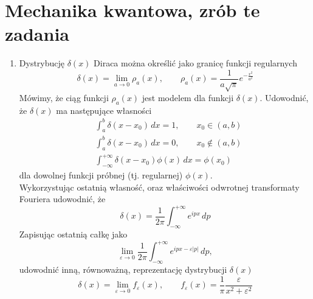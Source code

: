 \documentclass[a4paper,11pt]{article}
\begin{document}
\section{Mechanika kwantowa, zrób te zadania}





\begin{enumerate}
\item Dystrybucję $\delta( x )$ Diraca można określić jako granicę funkcji
  regularnych
  \begin{equation}
    \label{eq:1}
    \delta( x ) = \lim_{ a \to 0 } \rho_{ a }( x ), \qquad
    \rho_{ a }( x ) = \frac{ 1 }{ a \sqrt{ \pi } } e^{ -\frac{ x^{ 2 } }{ a^{ 2 } } }
  \end{equation}
  Mówimy, że ciąg funkcji $\rho_{ a }( x )$ jest modelem dla funkcji
  $\delta( x )$. Udowodnić, że $\delta( x )$ ma następujące własności
  \begin{align}
    &\int_{ a }^{ b } \delta( x - x_{ 0 } ) \, dx = 1, \qquad
      x_{ 0 } \in ( a, b ) \\
    &\int_{ a }^{ b } \delta( x - x_{ 0 } ) \, dx = 0, \qquad
      x_{ 0 } \notin ( a, b ) \\
    &\int_{ -\infty }^{ +\infty } \delta( x - x_{ 0 } ) \phi( x ) \, dx = \phi( x_{ 0 } )
  \end{align}
  dla dowolnej funkcji próbnej (tj. regularnej) $\phi( x )$. \\
  Wykorzystując ostatnią własność, oraz właściwości odwrotnej
  transformaty Fouriera udowodnić, że
  \begin{equation}
    \label{eq:2}
    \delta( x ) = \frac{ 1 }{ 2\pi } \int_{ -\infty }^{ +\infty } e^{ i p x } \, dp
  \end{equation}
  Zapisując ostatnią całkę jako
  \begin{equation}
    \label{eq:3}
    \lim_{ \varepsilon \to 0 } \frac{ 1 }{ 2\pi } \int_{ -\infty }^{ +\infty } e^{ ipx - \varepsilon | p | } \, dp,
  \end{equation}
  udowodnić inną, równoważną, reprezentację dystrybucji $\delta( x )$
  \begin{equation}
    \label{eq:4}
    \delta( x ) = \lim_{ \varepsilon \to 0 } f_{ \varepsilon }( x ), \qquad
    f_{ \varepsilon }( x ) = \frac{ 1 }{ \pi } \frac{ \varepsilon }{ x^{ 2 } + \varepsilon^{ 2 } }
  \end{equation}


\end{enumerate}
\end{document}
